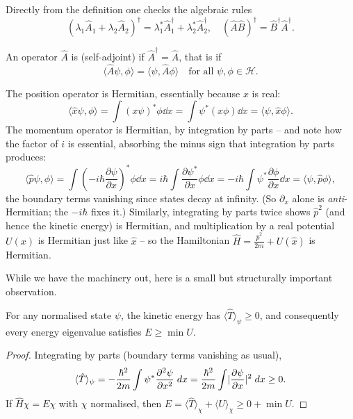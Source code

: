 \documentclass[a4paper]{scrartcl}
\newcommand{\inp}[2]{\langle #1, #2 \rangle}
\begin{document}
Directly from the definition one checks the algebraic rules
$$
(\lambda_1 \hat{A}_1 + \lambda_2 \hat{A}_2)^\dagger = \lambda_1^* \hat{A}_1^\dagger + \lambda_2^* \hat{A}_2^\dagger, \quad (\hat{A}\hat{B})^\dagger = \hat{B}^\dagger \hat{A}^\dagger.
$$

\begin{definition}
    An operator $\hat{A}$ is  (self-adjoint) if $\hat{A}^\dagger = \hat{A}$, that is if
    $$
    \inp{\hat{A} \psi}{\phi} = \inp{\psi}{\hat{A} \phi} \quad \text{for all } \psi, \phi \in \mathcal{H}.
    $$
\end{definition}

\begin{example}
    The position operator is Hermitian, essentially because $x$ is real:
    $$
    \inp{\hat{x}\psi}{\phi} = \int (x \psi)^* \phi \dd x = \int \psi^* (x \phi) \dd x = \inp{\psi}{\hat{x} \phi}.
    $$
    The momentum operator is Hermitian, by integration by parts -- and note how the factor of $i$ is essential, absorbing the minus sign that integration by parts produces:
    $$
    \inp{\hat{p}\psi}{\phi} = \int \left(-i\hbar \frac{\partial \psi}{\partial x}\right)^{\!*} \phi \dd x = i \hbar \int \frac{\partial \psi^*}{\partial x} \phi \dd x = -i\hbar\int \psi^* \frac{\partial \phi}{\partial x} \dd x = \inp{\psi}{\hat{p}\phi},
    $$
    the boundary terms vanishing since states decay at infinity. (So $\partial_x$ alone is \emph{anti}-Hermitian; the $-i\hbar$ fixes it.) Similarly, integrating by parts twice shows $\hat{p}^2$ (and hence the kinetic energy) is Hermitian, and multiplication by a real potential $U(x)$ is Hermitian just like $\hat{x}$ -- so the Hamiltonian $\hat{H} = \frac{\hat{p}^2}{2m} + U(\hat{x})$ is Hermitian.
\end{example}

While we have the machinery out, here is a small but structurally important observation.

\begin{proposition}
    For any normalised state $\psi$, the kinetic energy has $\langle \hat{T} \rangle_\psi \geq 0$, and consequently every energy eigenvalue satisfies $E \geq \min U$.
\end{proposition}
\begin{proof}
    Integrating by parts (boundary terms vanishing as usual),
    $$
    \langle \hat{T} \rangle_\psi = -\frac{\hbar^2}{2m}\int \psi^* \frac{\partial^2 \psi}{\partial x^2} \; d x = \frac{\hbar^2}{2m} \int \lvert\frac{\partial \psi}{\partial x}\rvert^2 \; d x \geq 0.
    $$
    If $\hat{H}\chi = E \chi$ with $\chi$ normalised, then $E = \langle \hat T \rangle_\chi + \langle U \rangle_\chi \geq 0 + \min U$.
\end{proof}
\end{document}
